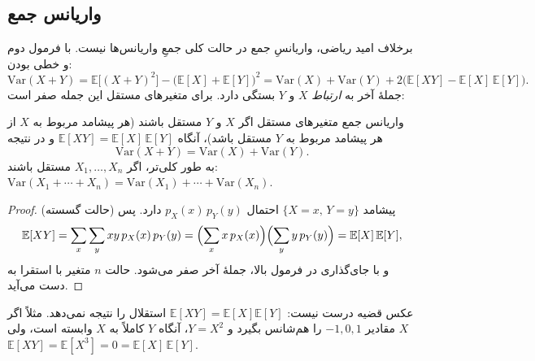 \subsection{واریانس جمع}

برخلاف امید ریاضی، واریانسِ جمع در حالت کلی جمعِ واریانس‌ها نیست. با فرمول دوم و خطی بودن:
\[ \mathrm{Var}(X+Y)=\mathbb E\bigl[(X+Y)^2\bigr]-\bigl(\mathbb E[X]+\mathbb E[Y]\bigr)^2=\mathrm{Var}(X)+\mathrm{Var}(Y)+2\bigl(\mathbb E[XY]-\mathbb E[X]\,\mathbb E[Y]\bigr). \]
جملهٔ آخر به \emph{ارتباط} $X$ و $Y$ بستگی دارد. برای متغیرهای مستقل این جمله صفر است:

\begin{theorem}[label=thm:var-sum]{واریانس جمع متغیرهای مستقل}
  اگر $X$ و $Y$ مستقل باشند (هر پیشامد مربوط به $X$ از هر پیشامد مربوط به $Y$ مستقل باشد)، آنگاه \newline $\mathbb E[XY]=\mathbb E[X]\,\mathbb E[Y]$ و در نتیجه
  \[ \mathrm{Var}(X+Y)=\mathrm{Var}(X)+\mathrm{Var}(Y). \]
  به طور کلی‌تر، اگر $X_1,\dots,X_n$ مستقل باشند: $\mathrm{Var}(X_1+\cdots+X_n)=\mathrm{Var}(X_1)+\cdots+\mathrm{Var}(X_n)$.
\end{theorem}

\begin{proof}
  (حالت گسسته) پیشامد $\{X=x,\,Y=y\}$ احتمال $p_X(x)\,p_Y(y)$ دارد. پس
  \[ \mathbb E[XY]=\sum_x\sum_yxy\,p_X(x)\,p_Y(y)=\Bigl(\sum_xx\,p_X(x)\Bigr)\Bigl(\sum_yy\,p_Y(y)\Bigr)=\mathbb E[X]\,\mathbb E[Y], \]
  و با جای‌گذاری در فرمول بالا، جملهٔ آخر صفر می‌شود. حالت $n$ متغیر با استقرا به دست می‌آید.
\end{proof}

\begin{warning}
  عکس قضیه درست نیست: $\mathbb E[XY]=\mathbb E[X]\mathbb E[Y]$ استقلال را نتیجه نمی‌دهد. مثلاً اگر $X$ مقادیر $-1,0,1$ را هم‌شانس بگیرد و $Y=X^2$، آنگاه $Y$ کاملاً به $X$ وابسته است، ولی \newline $\mathbb E[XY]=\mathbb E[X^3]=0=\mathbb E[X]\,\mathbb E[Y]$.
\end{warning}

